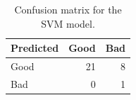 \begin{table}[ht]
\centering
\begin{tabular}{lrr}
  \hline
Predicted & Good & Bad \\ 
  \hline
Good &  21 &   8 \\ 
  Bad &   0 &   1 \\ 
   \hline
\end{tabular}
\caption{Confusion matrix for the SVM model.} 
\label{tab:svm_confusion_matrix}
\end{table}
